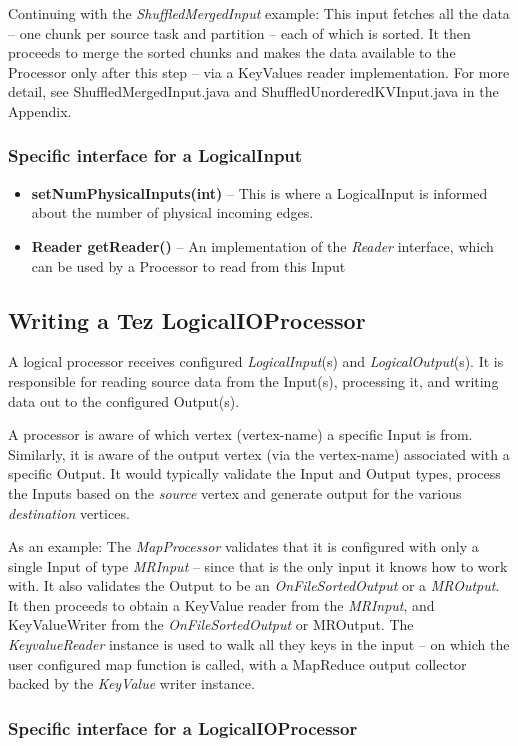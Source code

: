 \documentclass[twocolumn]{article}
\newcommand{\bi}{\begin{itemize}}
\newcommand{\ei}{\end{itemize}}
\newcommand{\ii}{\item}
\begin{document}
Continuing with the \textit{ShuffledMergedInput} example: This input fetches all
the data -- one chunk per source task and partition -- each of which is
sorted. It then proceeds to merge the sorted chunks and makes the data
available to the Processor only after this step -- via a KeyValues
reader implementation.
For more detail, see ShuffledMergedInput.java and ShuffledUnorderedKVInput.java in the Appendix.

\subsubsection*{Specific interface for a LogicalInput}
\bi
\ii \textbf{setNumPhysicalInputs(int)} -- This is where a LogicalInput is informed
about the number of physical incoming edges. 
\ii \textbf{Reader getReader()} -- An
implementation of the \textit{Reader} interface, which can be used by a Processor
to read from this Input
\ei

\subsection{Writing a Tez LogicalIOProcessor}

A logical processor receives configured \textit{LogicalInput}(s) and
\textit{LogicalOutput}(s). It is responsible for reading source data from the
Input(s), processing it, and writing data out to the configured
Output(s).

A processor is aware of which vertex (vertex-name) a specific Input is
from. Similarly, it is aware of the output vertex (via the vertex-name)
associated with a specific Output. It would typically validate the Input
and Output types, process the Inputs based on the \textit{source} vertex and
generate output for the various \textit{destination} vertices.

As an example: The \textit{MapProcessor} validates that it is configured with
only a single Input of type \textit{MRInput} -- since that is the only input it
knows how to work with. It also validates the Output to be an
\textit{OnFileSortedOutput} or a \textit{MROutput}. It then proceeds to obtain a KeyValue
reader from the \textit{MRInput}, and KeyValueWriter from the \textit{OnFileSortedOutput}
or MROutput. The \textit{KeyvalueReader} instance is used to walk all they keys
in the input -- on which the user configured map function is called,
with a MapReduce output collector backed by the \textit{KeyValue} writer
instance.

\subsubsection*{Specific interface for a LogicalIOProcessor}
\end{document}
